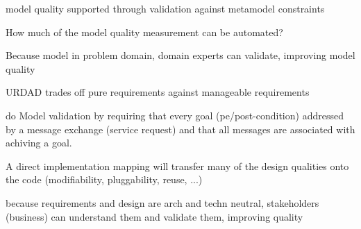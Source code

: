 model quality supported through validation against metamodel constraints

How much of the model quality measurement can be automated?

Because model in problem domain, domain experts can validate, improving model quality

URDAD trades off pure requirements against manageable requirements

\cite{graham_requirements_2008} do Model validation by requiring that every goal (pe/post-condition) addressed by a message exchange (service request) and that all messages are associated with achiving a goal.

A direct implementation mapping will transfer many of the design qualities onto the code (modifiability, pluggability, reuse, ...)

because requirements and design are arch and techn neutral, stakeholders (business) can understand them and validate them, improving quality
